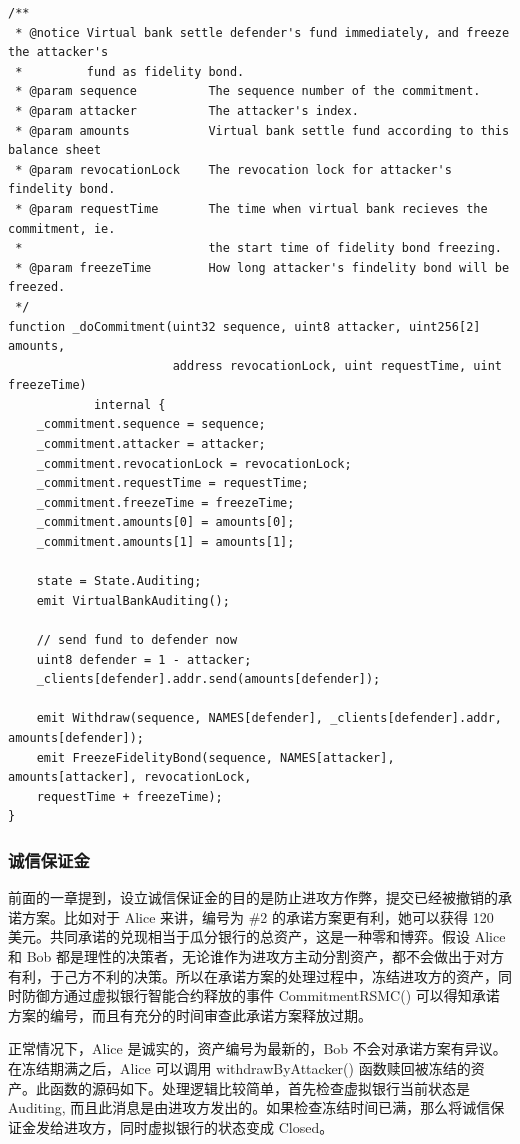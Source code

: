 \begin{lstlisting}[caption={执行共同承诺}, label={lst:_doCommitment}]
/**
 * @notice Virtual bank settle defender's fund immediately, and freeze the attacker's 
 *         fund as fidelity bond.
 * @param sequence          The sequence number of the commitment.
 * @param attacker          The attacker's index.
 * @param amounts           Virtual bank settle fund according to this balance sheet
 * @param revocationLock    The revocation lock for attacker's findelity bond.
 * @param requestTime       The time when virtual bank recieves the commitment, ie. 
 *                          the start time of fidelity bond freezing.
 * @param freezeTime        How long attacker's findelity bond will be freezed.
 */
function _doCommitment(uint32 sequence, uint8 attacker, uint256[2] amounts, 
                       address revocationLock, uint requestTime, uint freezeTime) 
            internal {
    _commitment.sequence = sequence;
    _commitment.attacker = attacker;
    _commitment.revocationLock = revocationLock;
    _commitment.requestTime = requestTime;
    _commitment.freezeTime = freezeTime;
    _commitment.amounts[0] = amounts[0];
    _commitment.amounts[1] = amounts[1];
    
    state = State.Auditing;
    emit VirtualBankAuditing();
    
    // send fund to defender now
    uint8 defender = 1 - attacker;
    _clients[defender].addr.send(amounts[defender]);
    
    emit Withdraw(sequence, NAMES[defender], _clients[defender].addr, amounts[defender]);
    emit FreezeFidelityBond(sequence, NAMES[attacker], amounts[attacker], revocationLock, 
    requestTime + freezeTime);
}
\end{lstlisting}

\subsubsection{诚信保证金}
前面的一章提到，设立诚信保证金的目的是防止进攻方作弊，提交已经被撤销的承诺方案。比如对于 Alice 来讲，编号为 \#2 的承诺方案更有利，她可以获得 120 美元。共同承诺的兑现相当于瓜分银行的总资产，这是一种零和博弈。假设 Alice 和 Bob 都是理性的决策者，无论谁作为进攻方主动分割资产，都不会做出于对方有利，于己方不利的决策。所以在承诺方案的处理过程中，冻结进攻方的资产，同时防御方通过虚拟银行智能合约释放的事件 CommitmentRSMC() 可以得知承诺方案的编号，而且有充分的时间审查此承诺方案释放过期。

正常情况下，Alice 是诚实的，资产编号为最新的，Bob 不会对承诺方案有异议。在冻结期满之后，Alice 可以调用 withdrawByAttacker() 函数赎回被冻结的资产。此函数的源码如下。处理逻辑比较简单，首先检查虚拟银行当前状态是 Auditing, 而且此消息是由进攻方发出的。如果检查冻结时间已满，那么将诚信保证金发给进攻方，同时虚拟银行的状态变成 Closed。


